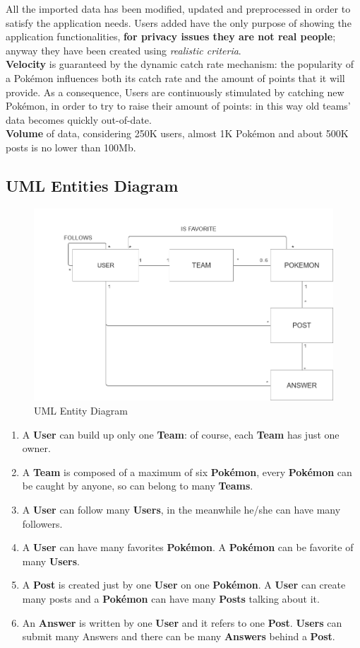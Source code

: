 All the imported data has been modified, updated and preprocessed in order to satisfy the application needs. 
Users added have the only purpose of showing the application functionalities, \textbf{for privacy issues they are not real people}; anyway they have been created using \textit{realistic criteria}. \medskip\\
\textbf{Velocity} is guaranteed by the dynamic catch rate mechanism: the popularity of a Pokémon influences both its catch rate and the amount of points that it will provide. As a consequence, Users are continuously stimulated by catching new Pokémon, in order to try to raise their amount of points: in this way old teams’ data becomes quickly out-of-date. \\
\textbf{Volume} of data, considering 250K users, almost 1K Pokémon and about 500K posts is no lower than 100Mb.\\
\subsection{UML Entities Diagram}
\begin{figure}[H]
	\centering
	\includegraphics[width=\textwidth]{img/entity_diagram.png}
	\caption{UML Entity Diagram}
\end{figure}
\begin{enumerate}
	\item A \textbf{User} can build up only one \textbf{Team}: of course, each \textbf{Team} has just one owner.
	\item A \textbf{Team} is composed of a maximum of six \textbf{Pokémon}, every \textbf{Pokémon} can be caught by anyone, so can belong to many \textbf{Teams}.
	\item A \textbf{User} can follow many \textbf{Users}, in the meanwhile he/she can have many followers.
	\item A \textbf{User} can have many favorites \textbf{Pokémon}. A \textbf{Pokémon} can be favorite of many \textbf{Users}.
	\item A \textbf{Post} is created just by one \textbf{User} on one \textbf{Pokémon}. A \textbf{User} can create many posts and a \textbf{Pokémon} can have many \textbf{Posts} talking about it.
	\item An \textbf{Answer} is written by one \textbf{User} and it refers to one \textbf{Post}. \textbf{Users} can submit many Answers and there can be many \textbf{Answers} behind a \textbf{Post}.
\end{enumerate}
